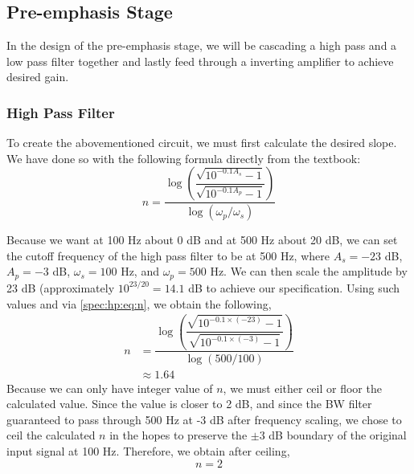\documentclass[report]{IEEEtran}
\begin{document}
		\subsection{Pre-emphasis Stage}
			In the design of the pre-emphasis stage, we will be cascading a high pass and a low pass filter together and lastly feed through a inverting amplifier to achieve desired gain.
			
			\subsubsection{High Pass Filter}
				To create the abovementioned circuit, we must first calculate the desired slope. We have done so with the following formula directly from the textbook:
				\begin{equation}
					\label{spec:hp:eq:n}
						n=\dfrac{
							\log{\left(
								\dfrac{
									\sqrt{10^{-0.1A_s}-1}
								}{
									\sqrt{10^{-0.1A_p}-1}
								}
							\right)}}{
							\log{
								(\omega_p / \omega_s)
							}
						}
				\end{equation}
				
				Because we want at 100 Hz about 0 dB and at 500 Hz about 20 dB, we can set the cutoff frequency of the high pass filter to be at 500 Hz, where $A_s = -23$ dB, $A_p = -3$ dB, $\omega_s=100$ Hz, and $\omega_p=500$ Hz. We can then scale the amplitude by 23 dB (approximately $10^{23/20} = 14.1 $ dB to achieve our specification. Using such values and via \eqref{spec:hp:eq:n}, we obtain the following,
				\begin{align*}
					n&=\dfrac{
						\log{\left(
							\dfrac{
								\sqrt{10^{-0.1\times (-23)}-1}
							}{
								\sqrt{10^{-0.1\times (-3)}-1}
							}
						\right)}}{
						\log{
							(500 / 100)
						}
					} \\
					&\approx 1.64
				\end{align*}
				Because we can only have integer value of $n$, we must either ceil or floor the calculated value. Since the value is closer to 2 dB, and since the BW filter guaranteed to pass through 500 Hz at -3 dB after frequency scaling, we chose to ceil the calculated $n$ in the hopes to preserve the $\pm 3$ dB boundary of the original input signal at 100 Hz. Therefore, we obtain after ceiling,
				\begin{equation}
					\label{spec:hp:n}
					n=2
				\end{equation}
				
\end{document}
